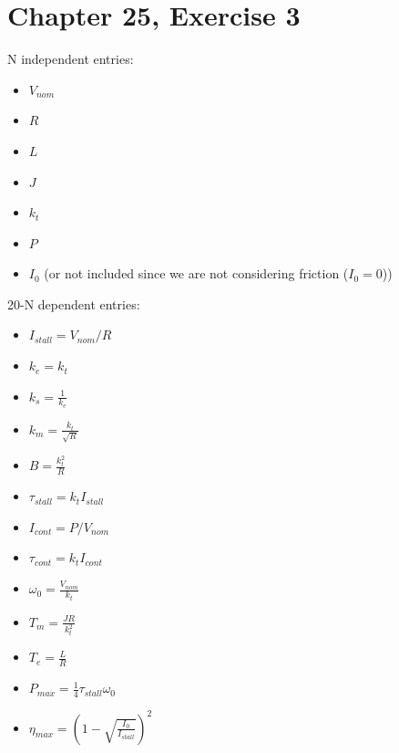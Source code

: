 \documentclass[12pt]{article}
\begin{document}
\section*{Chapter 25, Exercise 3}
N independent entries:
\begin{itemize}
    \item 
    $V_{nom}$

    \item 
    $R$

    \item 
    $L$

    \item 
    $J$

    \item 
    $k_t$

    \item 
    $P$

    \item 
    $I_0$ (or not included since we are not considering friction ($I_0 = 0$))

\end{itemize}

20-N dependent entries:
\begin{itemize}
    \item 
    $I_{stall} = V_{nom}/R$

    \item
    $k_e = k_t$

    \item
    $k_s = \frac{1}{k_e}$

    \item
    $k_m = \frac{k_t}{\sqrt{R}}$

    \item
    $B = \frac{k_t^2}{R}$

    \item 
    $\tau_{stall} = k_t I_{stall}$

    \item 
    $I_{cont} = P/V_{nom}$

    \item 
    $\tau_{cont} = k_t I_{cont}$

    \item 
    $\omega_0 = \frac{V_{nom}}{k_t}$

    \item 
    $T_m = \frac{J R}{k_t^2}$

    \item 
    $T_e = \frac{L}{R}$

    \item 
    $P_{max} = \frac{1}{4} \tau_{stall} \omega_0$
    
    \item 
    $\eta_{max} = (1 - \sqrt{\frac{I_0}{I_{stall}}})^2$

\end{itemize}
\end{document}
